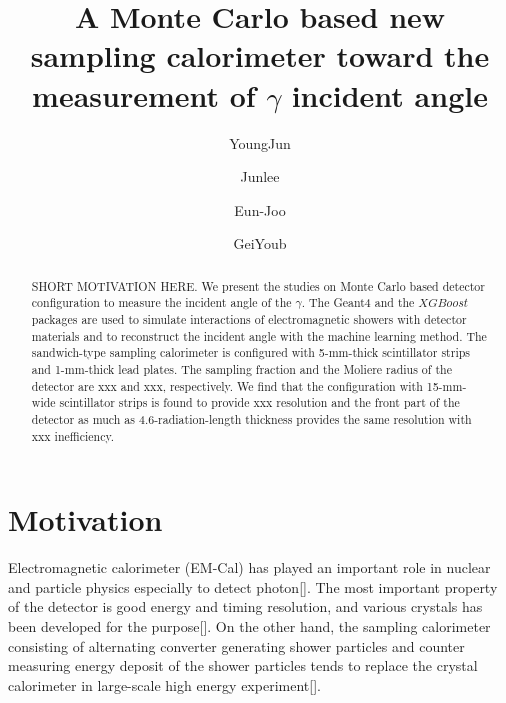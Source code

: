 \documentclass[jkps,preprint,fleqn,showpacs,showkeys]{revtex4}
\newcommand{\XGB}{XGBoost}
\begin{document}
\setcounter{page}{0}
\title[]{ A Monte Carlo based new sampling calorimeter toward the measurement of $\gamma$ incident angle }

\author{YoungJun }
\author{Junlee }
\author{Eun-Joo }
\author{GeiYoub  }


\begin{abstract}
SHORT MOTIVATION HERE. 
We present the studies on Monte Carlo based detector configuration to measure the incident angle of the $\gamma$. The Geant4 and the $\XGB$ packages are used to simulate interactions of electromagnetic showers with detector materials and to reconstruct the incident angle with the machine learning method. The sandwich-type sampling calorimeter is configured with 5-mm-thick scintillator strips and 1-mm-thick lead plates. The sampling fraction and the Moliere radius of the detector are xxx and xxx, respectively. We find that the configuration with 15-mm-wide scintillator strips is found to provide xxx resolution and the front part of the detector as much as 4.6-radiation-length thickness provides the same resolution with xxx inefficiency.
\end{abstract}


\maketitle

\section{Motivation}
\label{sec:mot}
Electromagnetic calorimeter (EM-Cal) has played an important role in nuclear and particle physics especially to detect photon[]. The most important property of the detector is good energy and timing resolution, and various crystals has been developed for the purpose[]. On the other hand, the sampling calorimeter consisting of alternating converter generating shower particles and counter measuring energy deposit of the shower particles tends to replace the crystal calorimeter in large-scale high energy experiment[].
\end{document}

